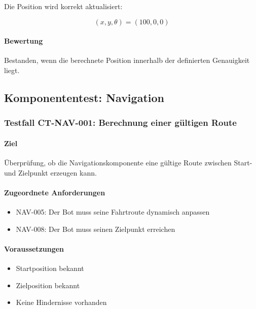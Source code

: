 Die Position wird korrekt aktualisiert:

\[
(x,y,\theta)=(100,0,0)
\]

\paragraph{Bewertung}\label{bewertung-1}

Bestanden, wenn die berechnete Position innerhalb der definierten
Genauigkeit liegt.

\subsection{Komponententest:
Navigation}\label{komponententest-navigation}

\subsubsection{Testfall CT-NAV-001: Berechnung einer gültigen
Route}\label{testfall-ct-nav-001-berechnung-einer-guxfcltigen-route}

\paragraph{Ziel}\label{ziel-2}

Überprüfung, ob die Navigationskomponente eine gültige Route zwischen
Start- und Zielpunkt erzeugen kann.

\paragraph{Zugeordnete Anforderungen}\label{zugeordnete-anforderungen-2}

\begin{itemize}
\tightlist
\item
  NAV-005: Der Bot muss seine Fahrtroute dynamisch anpassen
\item
  NAV-008: Der Bot muss seinen Zielpunkt erreichen
\end{itemize}

\paragraph{Voraussetzungen}\label{voraussetzungen-2}

\begin{itemize}
\tightlist
\item
  Startposition bekannt
\item
  Zielposition bekannt
\item
  Keine Hindernisse vorhanden
\end{itemize}

